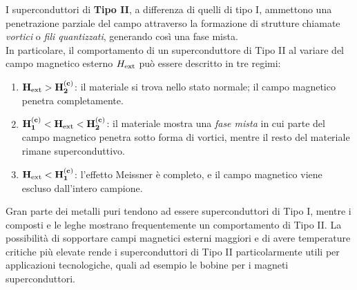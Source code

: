 I superconduttori di \textbf{Tipo II}, a differenza di quelli di tipo I, ammettono una penetrazione parziale del campo attraverso la formazione di strutture chiamate \emph{vortici} o \emph{fili quantizzati}, generando così una fase mista.\\
In particolare, il comportamento di un superconduttore di Tipo II al variare del campo magnetico esterno \(H_{\rm ext}\) può essere descritto in tre regimi:
\begin{enumerate}
    \item \(\mathbf{H_{\rm ext} > H_2^{(c)}}\): il materiale si trova nello stato normale; il campo magnetico penetra completamente.
    \item \(\mathbf{H_1^{(c)} < H_{\rm ext} < H_2^{(c)}}\): il materiale mostra una \emph{fase mista} in cui parte del campo magnetico penetra sotto forma di vortici, mentre il resto del materiale rimane superconduttivo.
    \item \(\mathbf{H_{\rm ext} < H_1^{(c)}}\): l'effetto Meissner è completo, e il campo magnetico viene escluso dall'intero campione.
\end{enumerate}
Gran parte dei metalli puri tendono ad essere superconduttori di Tipo I, mentre i composti e le leghe mostrano frequentemente un comportamento di Tipo II. La possibilità di sopportare campi magnetici esterni maggiori e di avere temperature critiche più elevate rende i superconduttori di Tipo II particolarmente utili per applicazioni tecnologiche, quali ad esempio le bobine per i magneti superconduttori.

